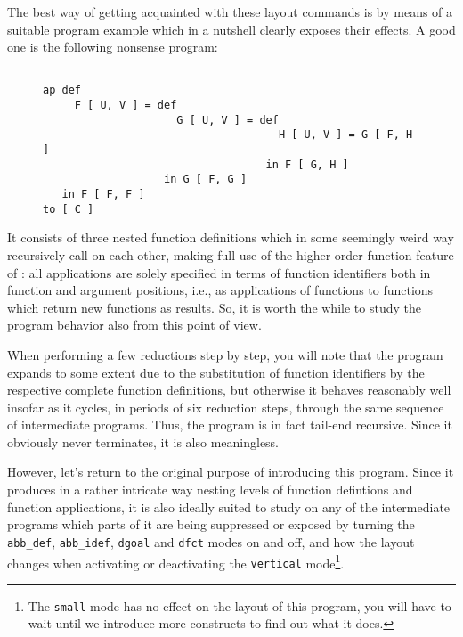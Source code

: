 The best way of getting acquainted with these {\mys layout commands} is by means of
a suitable program example which in a nutshell clearly exposes their effects.
A good one is the following nonsense program:
\begin{figure}
\begin{verbatim}

ap def 
     F [ U, V ] = def 
                     G [ U, V ] = def 
                                     H [ U, V ] = G [ F, H ]
                                   in F [ G, H ]
                   in G [ F, G ]
   in F [ F, F ]
to [ C ]

\end{verbatim}
\end{figure}
It consists of three nested function definitions which in some seemingly
 weird way
recursively call on each other, making
full use of the {\mys higher-order function} feature of \kir:
all applications are solely
specified in terms of function identifiers both in function and
argument positions, i.e., as applications of functions to functions which
 return new functions as results. So, it is worth the while to study
 the program behavior
also from this point of view.

 When performing a few reductions step by step, you
will note that the program expands to some extent due to the substitution
of function identifiers by the respective complete function definitions, but 
otherwise it behaves reasonably well insofar as it cycles, in periods of
six reduction steps, through the same sequence of intermediate programs.
Thus, the program is in fact tail-end recursive. Since it obviously never
terminates, it is also meaningless.
 
However, let's return to the original purpose of introducing this program.
Since it produces in a rather intricate way nesting levels of
function defintions and function applications, it is also ideally suited
to study on any of the intermediate programs
 which parts of it are being suppressed or exposed by turning the
 {\tt abb\_def}, {\tt abb\_idef},
{\tt dgoal} and {\tt dfct} modes on and off, and how the layout changes when
activating or deactivating the {\tt vertical} mode\footnote{The {\tt small} mode has no effect on the layout of this program, you will have to wait until we
introduce more \kir constructs to find out what it does.}.

